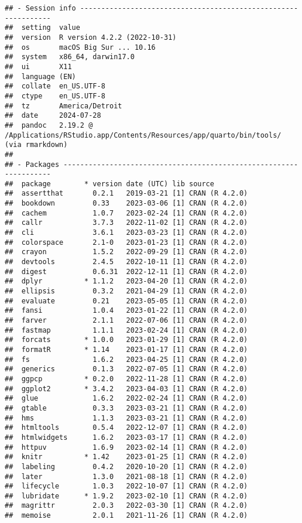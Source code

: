 \documentclass[print]{nuthesis}
\begin{document}
\begin{verbatim}
## - Session info ---------------------------------------------------------------
##  setting  value
##  version  R version 4.2.2 (2022-10-31)
##  os       macOS Big Sur ... 10.16
##  system   x86_64, darwin17.0
##  ui       X11
##  language (EN)
##  collate  en_US.UTF-8
##  ctype    en_US.UTF-8
##  tz       America/Detroit
##  date     2024-07-28
##  pandoc   2.19.2 @ /Applications/RStudio.app/Contents/Resources/app/quarto/bin/tools/ (via rmarkdown)
## 
## - Packages -------------------------------------------------------------------
##  package        * version date (UTC) lib source
##  assertthat       0.2.1   2019-03-21 [1] CRAN (R 4.2.0)
##  bookdown         0.33    2023-03-06 [1] CRAN (R 4.2.0)
##  cachem           1.0.7   2023-02-24 [1] CRAN (R 4.2.0)
##  callr            3.7.3   2022-11-02 [1] CRAN (R 4.2.0)
##  cli              3.6.1   2023-03-23 [1] CRAN (R 4.2.0)
##  colorspace       2.1-0   2023-01-23 [1] CRAN (R 4.2.0)
##  crayon           1.5.2   2022-09-29 [1] CRAN (R 4.2.0)
##  devtools         2.4.5   2022-10-11 [1] CRAN (R 4.2.0)
##  digest           0.6.31  2022-12-11 [1] CRAN (R 4.2.0)
##  dplyr          * 1.1.2   2023-04-20 [1] CRAN (R 4.2.0)
##  ellipsis         0.3.2   2021-04-29 [1] CRAN (R 4.2.0)
##  evaluate         0.21    2023-05-05 [1] CRAN (R 4.2.0)
##  fansi            1.0.4   2023-01-22 [1] CRAN (R 4.2.0)
##  farver           2.1.1   2022-07-06 [1] CRAN (R 4.2.0)
##  fastmap          1.1.1   2023-02-24 [1] CRAN (R 4.2.0)
##  forcats        * 1.0.0   2023-01-29 [1] CRAN (R 4.2.0)
##  formatR        * 1.14    2023-01-17 [1] CRAN (R 4.2.0)
##  fs               1.6.2   2023-04-25 [1] CRAN (R 4.2.0)
##  generics         0.1.3   2022-07-05 [1] CRAN (R 4.2.0)
##  ggpcp          * 0.2.0   2022-11-28 [1] CRAN (R 4.2.0)
##  ggplot2        * 3.4.2   2023-04-03 [1] CRAN (R 4.2.0)
##  glue             1.6.2   2022-02-24 [1] CRAN (R 4.2.0)
##  gtable           0.3.3   2023-03-21 [1] CRAN (R 4.2.0)
##  hms              1.1.3   2023-03-21 [1] CRAN (R 4.2.0)
##  htmltools        0.5.4   2022-12-07 [1] CRAN (R 4.2.0)
##  htmlwidgets      1.6.2   2023-03-17 [1] CRAN (R 4.2.0)
##  httpuv           1.6.9   2023-02-14 [1] CRAN (R 4.2.0)
##  knitr          * 1.42    2023-01-25 [1] CRAN (R 4.2.0)
##  labeling         0.4.2   2020-10-20 [1] CRAN (R 4.2.0)
##  later            1.3.0   2021-08-18 [1] CRAN (R 4.2.0)
##  lifecycle        1.0.3   2022-10-07 [1] CRAN (R 4.2.0)
##  lubridate      * 1.9.2   2023-02-10 [1] CRAN (R 4.2.0)
##  magrittr         2.0.3   2022-03-30 [1] CRAN (R 4.2.0)
##  memoise          2.0.1   2021-11-26 [1] CRAN (R 4.2.0)

\end{verbatim}
\end{document}

